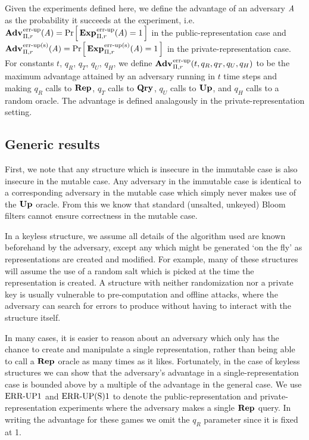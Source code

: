Given the experiments defined here, we define the advantage of an adversary $\mathit{A}$ as the probability it succeeds at the experiment, i.e. $\Adv{\errep}_{\struct,r}(\advA) = \Prob{\Exp{\errep}_{\struct,r}(\advA) = 1}$ in the public-representation case and $\Adv{\erreps}_{\struct,r}(\advA) = \Prob{\Exp{\erreps}_{\struct,r}(\advA) = 1}$ in the private-representation case. For constants $t$, $q_R$, $q_T$, $q_U$, $q_H$, we define $\Adv{\errep}_{\struct,r}(t,q_R,q_T,q_U,q_H)$ to be the maximum advantage attained by an adversary running in $t$ time steps and making $q_R$ calls to $\mathbf{Rep}\hspace{0.5pt}$, $q_T$ calls to $\mathbf{Qry}\hspace{0.5pt}$, $q_U$ calls to $\mathbf{Up}\hspace{0.5pt}$, and $q_H$ calls to a random oracle. The advantage is defined analagously in the private-representation setting.

\subsection{Generic results}
First, we note that any structure which is insecure in the immutable case is also insecure in the mutable case. Any adversary in the immutable case is identical to a corresponding adversary in the mutable case which simply never makes use of the $\mathbf{Up}\hspace{0.5pt}$ oracle. From this we know that standard (unsalted, unkeyed) Bloom filters cannot ensure correctness in the mutable case. 



In a keyless structure, we assume all details of the algorithm used are known beforehand by the adversary, except any which might be generated `on the fly' as representations are created and modified. For example, many of these structures will assume the use of a random salt which is picked at the time the representation is created. A structure with neither randomization nor a private key is usually vulnerable to pre-computation and offline attacks, where the adversary can search for errors to produce without having to interact with the structure itself.

In many cases, it is easier to reason about an adversary which only has the chance to create and manipulate a single representation, rather than being able to call a $\mathbf{Rep}\hspace{0.5pt}$ oracle as many times as it likes. Fortunately, in the case of keyless structures we can show that the adversary's advantage in a single-representation case is bounded above by a multiple of the advantage in the general case. We use $\textnormal{ERR\mbox{-}UP}1$ and $\textnormal{ERR\mbox{-}UP(S)}1$ to denote the public-representation and private-representation experiments where the adversary makes a single $\mathbf{Rep}\hspace{0.5pt}$ query. In writing the advantage for these games we omit the $q_R$ parameter since it is fixed at 1.

